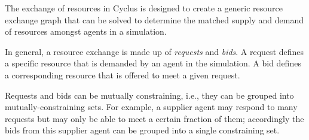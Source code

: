The exchange of resources in Cyclus is designed to create a generic resource
exchange graph that can be solved to determine the matched supply and demand of
resources amongst agents in a simulation.

In general, a resource exchange is made up of \textit{requests} and
\textit{bids}. A request defines a specific resource that is demanded by an
agent in the simulation. A bid defines a corresponding resource that is offered
to meet a given request.

Requests and bids can be mutually constraining, i.e., they can be grouped into
mutually-constraining sets. For example, a supplier agent may respond to many
requests but may only be able to meet a certain fraction of them; accordingly
the bids from this supplier agent can be grouped into a single constraining set.
